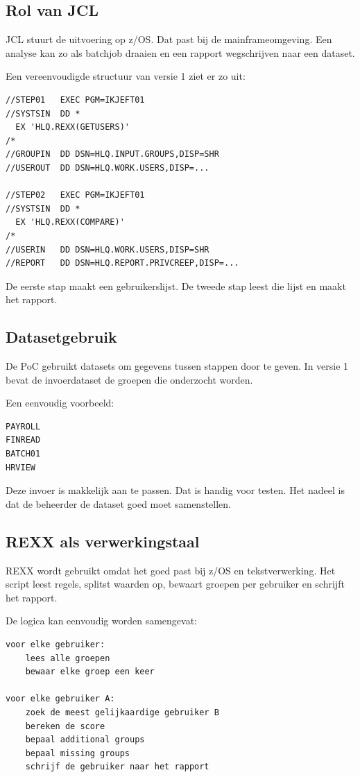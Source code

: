\subsection*{Rol van JCL}

JCL stuurt de uitvoering op z/OS. Dat past bij de mainframeomgeving. Een analyse kan zo als batchjob draaien en een rapport wegschrijven naar een dataset.

Een vereenvoudigde structuur van versie 1 ziet er zo uit:

\begin{verbatim}
//STEP01   EXEC PGM=IKJEFT01
//SYSTSIN  DD *
  EX 'HLQ.REXX(GETUSERS)'
/*
//GROUPIN  DD DSN=HLQ.INPUT.GROUPS,DISP=SHR
//USEROUT  DD DSN=HLQ.WORK.USERS,DISP=...

//STEP02   EXEC PGM=IKJEFT01
//SYSTSIN  DD *
  EX 'HLQ.REXX(COMPARE)'
/*
//USERIN   DD DSN=HLQ.WORK.USERS,DISP=SHR
//REPORT   DD DSN=HLQ.REPORT.PRIVCREEP,DISP=...
\end{verbatim}

De eerste stap maakt een gebruikerslijst. De tweede stap leest die lijst en maakt het rapport.

\subsection*{Datasetgebruik}

De PoC gebruikt datasets om gegevens tussen stappen door te geven. In versie 1 bevat de invoerdataset de groepen die onderzocht worden.

Een eenvoudig voorbeeld:

\begin{verbatim}
PAYROLL
FINREAD
BATCH01
HRVIEW
\end{verbatim}

Deze invoer is makkelijk aan te passen. Dat is handig voor testen. Het nadeel is dat de beheerder de dataset goed moet samenstellen.

\subsection*{REXX als verwerkingstaal}

REXX wordt gebruikt omdat het goed past bij z/OS en tekstverwerking. Het script leest regels, splitst waarden op, bewaart groepen per gebruiker en schrijft het rapport.

De logica kan eenvoudig worden samengevat:

\begin{verbatim}
voor elke gebruiker:
    lees alle groepen
    bewaar elke groep een keer

voor elke gebruiker A:
    zoek de meest gelijkaardige gebruiker B
    bereken de score
    bepaal additional groups
    bepaal missing groups
    schrijf de gebruiker naar het rapport
\end{verbatim}

